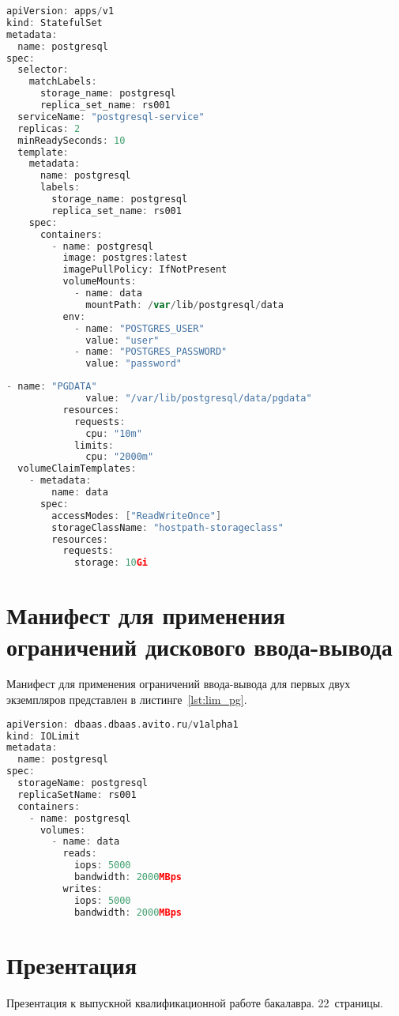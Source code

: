 \begin{appendices}
\begin{lstlisting}[language=Go,label=lst:sts_pg1, caption={Манифест для запуска PostgreSQL в Kubernetes}]
apiVersion: apps/v1
kind: StatefulSet
metadata:
  name: postgresql
spec:
  selector:
    matchLabels:
      storage_name: postgresql
      replica_set_name: rs001
  serviceName: "postgresql-service"
  replicas: 2
  minReadySeconds: 10
  template:
    metadata:
      name: postgresql
      labels:
        storage_name: postgresql
        replica_set_name: rs001
    spec:
      containers:
        - name: postgresql
          image: postgres:latest
          imagePullPolicy: IfNotPresent
          volumeMounts:
            - name: data
              mountPath: /var/lib/postgresql/data
          env:
            - name: "POSTGRES_USER"
              value: "user"
            - name: "POSTGRES_PASSWORD"
              value: "password"
\end{lstlisting}

\begin{lstlisting}[language=Go,label=lst:sts_pg2, caption={Манифест для запуска PostgreSQL в Kubernetes (продолжение листинга~\ref{lst:sts_pg1})}]
            - name: "PGDATA"
              value: "/var/lib/postgresql/data/pgdata"
          resources:
            requests:
              cpu: "10m"
            limits:
              cpu: "2000m"
  volumeClaimTemplates:
    - metadata:
        name: data
      spec:
        accessModes: ["ReadWriteOnce"]
        storageClassName: "hostpath-storageclass"
        resources:
          requests:
            storage: 10Gi
\end{lstlisting}

	\chapter{Манифест для применения ограничений дискового ввода-вывода}
	
Манифест для применения ограничений ввода-вывода для первых двух экземпляров представлен в листинге~\ref{lst:lim_pg}.

\begin{lstlisting}[language=Go,label=lst:lim_pg, caption={Манифест для применения ограничений ввода-вывода для первых двух экземпляров}]
apiVersion: dbaas.dbaas.avito.ru/v1alpha1
kind: IOLimit
metadata:
  name: postgresql
spec:
  storageName: postgresql
  replicaSetName: rs001
  containers:
    - name: postgresql
      volumes:
        - name: data
          reads:
            iops: 5000
            bandwidth: 2000MBps
          writes:
            iops: 5000
            bandwidth: 2000MBps
\end{lstlisting}

\chapter{Презентация}

Презентация к выпускной квалификационной работе бакалавра. 22~страницы.



\end{appendices}